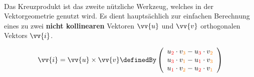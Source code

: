 \documentclass[main.tex]{subfiles}
\begin{document}
    \paragraph{} Das Kreuzprodukt ist das zweite nützliche Werkzeug, welches in der Vektorgeometrie genutzt wird. Es dient hauptsächlich zur einfachen Berechnung
    eines zu zwei \textbf{nicht kollinearen} Vektoren $\vv{u}$ und $\vv{v}$ orthogonalen Vektors $\vv{i}$. \\
    \begin{Definition}
      $$\vv{i} = \vv{u} \times \vv{v} \definedBy \left(\begin{array}{c} u_{\textcolor{red}{2}} \cdot v_{\textcolor{orange}{3}} - u_{\textcolor{red}{3}} \cdot v_{\textcolor{orange}{2}} \\ u_{\textcolor{red}{3}} \cdot v_{\textcolor{orange}{1}} - u_{\textcolor{red}{1}} \cdot v_{\textcolor{orange}{3}} \\ u_{\textcolor{red}{1}} \cdot v_{\textcolor{orange}{2}} - u_{\textcolor{red}{2}} \cdot v_{\textcolor{orange}{1}} \end{array}\right)$$
    \end{Definition}
\end{document}
